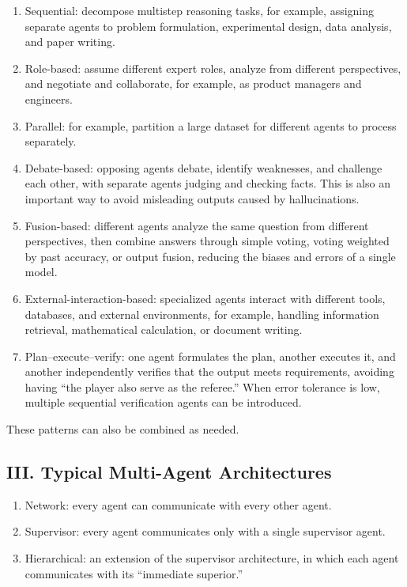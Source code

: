 \begin{enumerate}
\def\labelenumi{\arabic{enumi}.}
\item
  Sequential: decompose multistep reasoning tasks, for example, assigning separate agents to problem formulation, experimental design, data analysis, and paper writing.
\item
  Role-based: assume different expert roles, analyze from different perspectives, and negotiate and collaborate, for example, as product managers and engineers.
\item
  Parallel: for example, partition a large dataset for different agents to process separately.
\item
  Debate-based: opposing agents debate, identify weaknesses, and challenge each other, with separate agents judging and checking facts. This is also an important way to avoid misleading outputs caused by hallucinations.
\item
  Fusion-based: different agents analyze the same question from different perspectives, then combine answers through simple voting, voting weighted by past accuracy, or output fusion, reducing the biases and errors of a single model.
\item
  External-interaction-based: specialized agents interact with different tools, databases, and external environments, for example, handling information retrieval, mathematical calculation, or document writing.
\item
  Plan--execute--verify: one agent formulates the plan, another executes it, and another independently verifies that the output meets requirements, avoiding having ``the player also serve as the referee.'' When error tolerance is low, multiple sequential verification agents can be introduced.
\end{enumerate}

These patterns can also be combined as needed.

\hypertarget{iii.-typical-multi-agent-architectures}{%
\subsection{III. Typical Multi-Agent Architectures}\label{iii.-typical-multi-agent-architectures}}

\begin{enumerate}
\def\labelenumi{\arabic{enumi}.}
\item
  Network: every agent can communicate with every other agent.
\item
  Supervisor: every agent communicates only with a single supervisor agent.
\item
  Hierarchical: an extension of the supervisor architecture, in which each agent communicates with its ``immediate superior.''
\end{enumerate}

